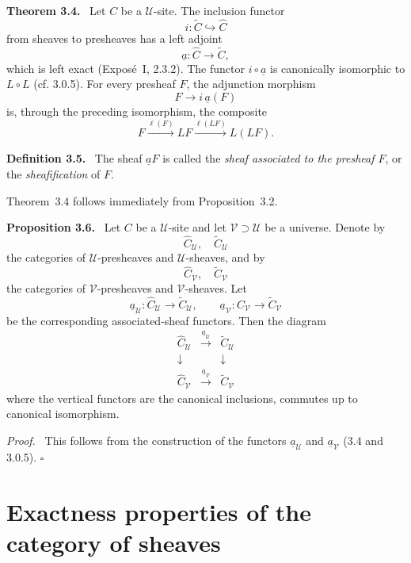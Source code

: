 \documentclass[11pt]{article}
\newcommand{\U}{\mathcal{U}}
\newcommand{\V}{\mathcal{V}}
\newcommand{\qedtext}{\hfill\(\square\)}
\newenvironment{statement}[1]{\par\medskip\noindent\textbf{#1.}\ }{\par\medskip}
\newenvironment{prooftext}{\par\noindent\emph{Proof.}\ }{\par\medskip}
\begin{document}
\begin{statement}{Theorem 3.4}
Let \(C\) be a \(\U\)-site. The inclusion functor
\[
i:\widetilde C\hookrightarrow \widehat C
\]
from sheaves to presheaves has a left adjoint
\[
\underline a:\widehat C\longrightarrow \widetilde C,
\]
which is left exact (Expos\'e~I, 2.3.2). The functor \(i\circ\underline a\) is canonically isomorphic to \(L\circ L\) (cf. 3.0.5). For every presheaf \(F\), the adjunction morphism
\[
F\longrightarrow i\,\underline a(F)
\]
is, through the preceding isomorphism, the composite
\[
F\xrightarrow{\ell(F)}LF\xrightarrow{\ell(LF)}L(LF).
\]
\end{statement}

\begin{statement}{Definition 3.5}
The sheaf \(\underline aF\) is called the \emph{sheaf associated to the presheaf \(F\)}, or the \emph{sheafification} of \(F\).
\end{statement}

Theorem~3.4 follows immediately from Proposition~3.2.

\begin{statement}{Proposition 3.6}
Let \(C\) be a \(\U\)-site and let \(\V\supset \U\) be a universe. Denote by
\[
\widehat C_{\U},\quad \widetilde C_{\U}
\]
the categories of \(\U\)-presheaves and \(\U\)-sheaves, and by
\[
\widehat C_{\V},\quad \widetilde C_{\V}
\]
the categories of \(\V\)-presheaves and \(\V\)-sheaves. Let
\[
\underline a_{\U}:\widehat C_{\U}\to \widetilde C_{\U},\qquad
\underline a_{\V}:\widehat C_{\V}\to \widetilde C_{\V}
\]
be the corresponding associated-sheaf functors. Then the diagram
\[
\begin{array}{ccc}
\widehat C_{\U} & \xrightarrow{\underline a_{\U}} & \widetilde C_{\U}\\
\downarrow && \downarrow\\
\widehat C_{\V} & \xrightarrow{\underline a_{\V}} & \widetilde C_{\V}
\end{array}
\]
where the vertical functors are the canonical inclusions, commutes up to canonical isomorphism.
\end{statement}

\begin{prooftext}
This follows from the construction of the functors \(\underline a_{\U}\) and \(\underline a_{\V}\) (3.4 and 3.0.5). \qedtext
\end{prooftext}

\section{Exactness properties of the category of sheaves}
\end{document}
